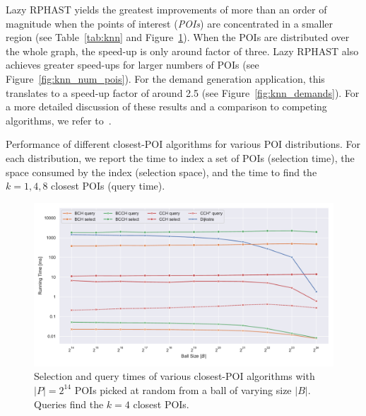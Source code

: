 \documentclass[manuscript,review]{acmart}
\begin{document}
Lazy RPHAST yields the greatest improvements of more than an order of magnitude when the points of interest (\emph{POIs}) are concentrated in a smaller region (see Table~\ref{tab:knn} and Figure~\ref{fig:knn_ball_size}).
When the POIs are distributed over the whole graph, the speed-up is only around factor of three.
Lazy RPHAST also achieves greater speed-ups for larger numbers of POIs (see Figure~\ref{fig:knn_num_pois}).
For the demand generation application, this translates to a speed-up factor of around 2.5 (see Figure~\ref{fig:knn_demands}).
For a more detailed discussion of these results and a comparison to competing algorithms, we refer to~\cite{buchhold_et_al:LIPIcs.SEA.2021.18}.

\begin{table}
\centering
\caption{
Performance of different closest-POI algorithms for various POI distributions.
For each distribution, we report the time to index a set of POIs (selection time), the space consumed by the
index (selection space), and the time to find the $k = 1, 4, 8$ closest POIs (query time).
}\label{tab:knn}

\end{table}

\begin{figure}
\centering
\includegraphics[width=\linewidth]{fig/knn_ball_size.pdf}
\caption{
Selection and query times of various closest-POI algorithms with $|P| = 2^{14}$ POIs picked at random from a ball of varying size $|B|$.
Queries find the $k = 4$ closest POIs.
}\label{fig:knn_ball_size}
\end{figure}
\end{document}
